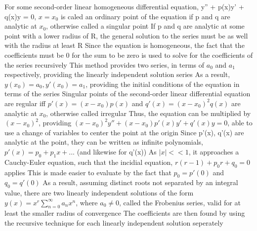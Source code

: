 \documentclass[11 pt, twoside]{article}
\newenvironment{outline*}
{
	\begin{outline}[enumerate]
	}
	{\end{outline}
}
\begin{document}
\begin{outline*}
\1 For some second-order linear homogeneous differential equation, y'' + p(x)y' + q(x)y = 0, $x = x_0$ is caled an ordinary point of the equation if p and q are analytic at $x_0$, otherwise called a singular point
	\2 If p and q are analytic at some point with a lower radius of R, the general solution to the series must be as well with the radius at least R
	\2 Since the equation is homogeneous, the fact that the coefficients must be 0 for the sum to be zero is used to solve for the coefficients of the series recursively
		\3 This method provides two series, in terms of $a_0$ and $a_1$ respectively, providing the linearly independent solution series
		\3 As a result, $y(x_0) = a_0, y'(x_0) = a_1$, providing the initial conditions of the equation in terms of the series
\1 Singular points of the second-order linear differential equation are regular iff $p'(x) = (x - x_0)p(x)$ and $q'(x) = (x - x_0)^2q(x)$ are analytic at $x_0$, otherwise called irregular
	\2 Thus, the equation can be multiplied by $(x - x_0)^2$, providing $(x - x_0)^2y'' + (x - x_0)p'(x)y' + q'(x)y = 0$, able to use a change of variables to center the point at the origin
	\2 Since p'(x), q'(x) are analytic at the point, they can be written as infinite polynomials, $p'(x) = p_0 + p_1x + ...$ (and likewise for q'(x))
		\3 As $|x| << 1$, it approaches a Cauchy-Euler equation, such that the incidial equation, $r(r - 1) + p_0r + q_0 = 0$ applies
			\4 This is made easier to evaluate by the fact that $p_0 = p'(0)$ and $q_0 = q'(0)$
		\3 As a result, assuming distinct roots not separated by an integral value, there are two linearly independent solutions of the form $y(x) = x^r\sum_{n = 0}^{\infty} a_nx^n$, where $a_0 \neq 0$, called the Frobenius series, valid for at least the smaller radius of convergence
	\2 The coefficients are then found by using the recursive technique for each linearly independent solution seperately
\1 
\end{outline*}
\end{document}
